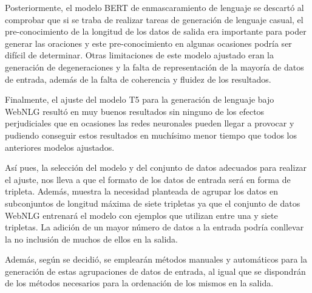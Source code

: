 Posteriormente, el modelo BERT de enmascaramiento de lenguaje se descartó al comprobar que si se traba de realizar tareas de generación de lenguaje casual,
el pre-conocimiento de la longitud de los datos de salida era importante para poder generar las oraciones y este pre-conocimiento en algunas ocasiones podría ser difícil de determinar. Otras limitaciones de este modelo ajustado eran la generación de degeneraciones y la falta de representación de la mayoría de datos de entrada, además de la falta de coherencia y fluidez de los resultados.

Finalmente, el ajuste del modelo T5 para la generación de lenguaje bajo WebNLG resultó en muy buenos resultados sin ninguno de los efectos perjudiciales que en ocasiones las redes neuronales pueden llegar a provocar y pudiendo conseguir estos resultados en muchísimo menor tiempo que todos los anteriores modelos ajustados.

Así pues, la selección del modelo y del conjunto de datos adecuados para realizar el ajuste, nos lleva a que el formato de los datos de entrada será en forma de tripleta. Además, muestra la necesidad planteada de agrupar los datos en subconjuntos de longitud máxima de siete tripletas ya que el conjunto de datos WebNLG entrenará el modelo con ejemplos que utilizan entre una y siete tripletas. La adición de un mayor número de datos a la entrada podría conllevar la no inclusión de muchos de ellos en la salida.

Además, según se decidió, se emplearán métodos manuales y automáticos para la generación de estas agrupaciones de datos de entrada, al igual que se dispondrán de los métodos necesarios para la ordenación de los mismos en la salida.